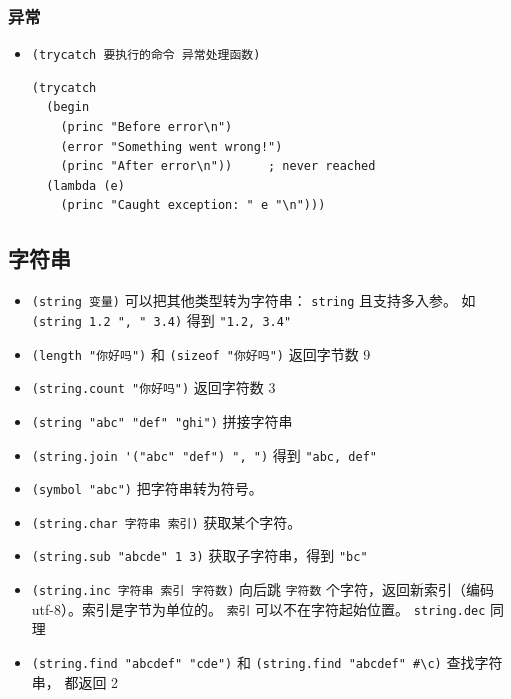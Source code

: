 \subsubsection{异常}
\begin{itemize}
\item \verb`(trycatch 要执行的命令 异常处理函数)`
\begin{lstlisting}[language=none]
(trycatch
  (begin
    (princ "Before error\n")
    (error "Something went wrong!")
    (princ "After error\n"))     ; never reached
  (lambda (e)
    (princ "Caught exception: " e "\n")))
\end{lstlisting}
\end{itemize}


\subsection{字符串}
\begin{itemize}
\item \verb`(string 变量)` 可以把其他类型转为字符串： \verb`string` 且支持多入参。 如 \verb`(string 1.2 ", " 3.4)` 得到 \verb`"1.2, 3.4"`
\item \verb`(length "你好吗")` 和 \verb`(sizeof "你好吗")` 返回字节数 9
\item \verb`(string.count "你好吗")` 返回字符数 3
\item \verb`(string "abc" "def" "ghi")` 拼接字符串
\item \verb`(string.join '("abc" "def") ", ")` 得到 \verb`"abc, def"`
\item \verb`(symbol "abc")` 把字符串转为符号。
\item \verb`(string.char 字符串 索引)` 获取某个字符。
\item \verb`(string.sub "abcde" 1 3)` 获取子字符串，得到 \verb`"bc"`
\item \verb`(string.inc 字符串 索引 字符数)` 向后跳 \verb`字符数` 个字符，返回新索引（编码 utf-8）。索引是字节为单位的。 \verb`索引` 可以不在字符起始位置。 \verb`string.dec` 同理
\item \verb`(string.find "abcdef" "cde")` 和 \verb`(string.find "abcdef" #\c)` 查找字符串， 都返回 2
\end{itemize}


